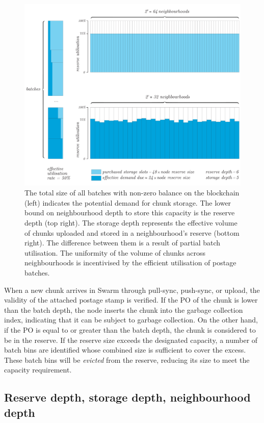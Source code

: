 \begin{figure}[!ht]
  \centering
    \includegraphics[width=.9\textwidth]{fig/supply-demand_new.pdf}
  \caption[Reserve capacity]{The total size of all batches with non-zero balance on the blockchain (left) indicates the potential demand for chunk storage. The lower bound on neighbourhood depth to store this capacity is the reserve depth (top right). The storage depth represents the effective volume of chunks uploaded and stored in a neighbourhood's reserve (bottom right). The difference between them is a result of partial batch utilisation. The uniformity of the volume of chunks across neighbourhoods is incentivised by the efficient utilisation of postage batches.}
\label{fig:reserve-capacity}
\end{figure}    

When a new chunk arrives in Swarm through pull-sync, push-sync, or upload, the validity  of the attached  postage stamp is verified. If the PO of the chunk is lower than the batch depth, the node inserts the chunk into the  garbage collection index, indicating that it can be subject to garbage collection. On the other hand, if the PO is equal to or greater than the batch depth, the chunk is considered to be in the reserve. 
If the reserve size exceeds the designated capacity, a number of batch bins are identified whose combined size is sufficient to cover the excess. These batch bins will be \emph{evicted} from the reserve, reducing its size to meet the capacity requirement. 


\subsection{Reserve depth, storage depth, neighbourhood depth}\label{sec:depths}



